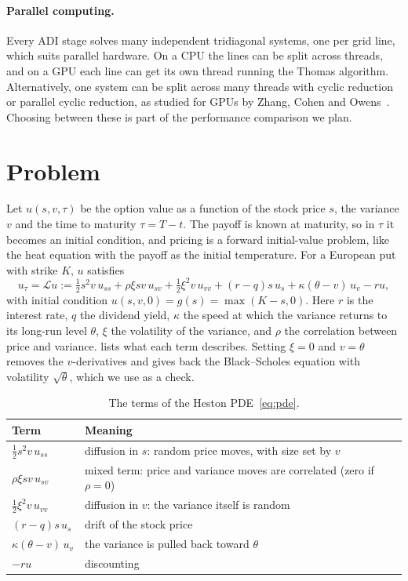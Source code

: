 \documentclass[11pt]{article}
\newcommand{\Lop}{\mathcal{L}}
\begin{document}
\paragraph{Parallel computing.}
Every ADI stage solves many independent tridiagonal systems, one per grid line, which suits parallel hardware.
On a CPU the lines can be split across threads, and on a GPU each line can get its own thread running the
Thomas algorithm. Alternatively, one system can be split across many threads with cyclic reduction or parallel
cyclic reduction, as studied for GPUs by Zhang, Cohen and Owens~\cite{zhang2010}. Choosing between these is
part of the performance comparison we plan.

\section{Problem}
Let $u(s,v,\tau)$ be the option value as a function of the stock price $s$, the variance $v$ and the time to
maturity $\tau=T-t$. The payoff is known at maturity, so in $\tau$ it becomes an initial condition, and pricing
is a forward initial-value problem, like the heat equation with the payoff as the initial temperature.
For a European put with strike $K$, $u$ satisfies
\begin{equation}\label{eq:pde}
  u_\tau = \Lop u := \tfrac12 s^2 v\,u_{ss} + \rho\xi s v\,u_{sv} + \tfrac12\xi^2 v\,u_{vv}
  + (r-q)s\,u_s + \kappa(\theta-v)\,u_v - r u,
\end{equation}
with initial condition $u(s,v,0) = g(s) = \max(K-s,0)$. Here $r$ is the interest rate, $q$ the dividend yield, $\kappa$ the speed at which the variance returns to its
long-run level $\theta$, $\xi$ the volatility of the variance, and $\rho$ the correlation between price and
variance.  lists what each term describes. Setting $\xi=0$ and $v=\theta$ removes the
$v$-derivatives and gives back the Black--Scholes equation with volatility $\sqrt\theta$, which we use as a check.

\begin{table}[ht]
  \centering
  \caption{The terms of the Heston PDE~\eqref{eq:pde}.}
  \label{tab:terms}
  \begin{tabular}{ll}
    \hline
    Term & Meaning \\
    \hline
    $\tfrac12 s^2 v\,u_{ss}$ & diffusion in $s$: random price moves, with size set by $v$ \\
    $\rho\xi s v\,u_{sv}$ & mixed term: price and variance moves are correlated (zero if $\rho=0$) \\
    $\tfrac12\xi^2 v\,u_{vv}$ & diffusion in $v$: the variance itself is random \\
    $(r-q)s\,u_s$ & drift of the stock price \\
    $\kappa(\theta-v)\,u_v$ & the variance is pulled back toward $\theta$ \\
    $-ru$ & discounting \\
    \hline
  \end{tabular}
\end{table}
\end{document}
